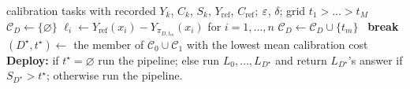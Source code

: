 \begin{algorithm}[!t]
\caption{\climb{} calibration and deployment}
\label{alg:climb}
\small
\begin{algorithmic}[1]
\Require calibration tasks with recorded $Y_k$, $C_k$, $S_k$, $Y_{\mathrm{ref}}$, $C_{\mathrm{ref}}$; $\varepsilon$, $\delta$; grid $t_1 > \dots > t_M$
 
  \State $\mathcal{C}_D \gets \{\varnothing\}$
    \State $\ell_i \gets Y_{\mathrm{ref}}(x_i) - Y_{\pi_{D, t_m}}(x_i)$ for $i = 1, \dots, n$
     $\mathcal{C}_D \gets \mathcal{C}_D \cup \{t_m\}$
    \Else\ \textbf{break}
    \EndIf
  \EndFor
\EndFor
\State $(D^\star, t^\star) \gets$ the member of $\mathcal{C}_0 \cup \mathcal{C}_1$ with the lowest mean calibration cost
\State \textbf{Deploy:} if $t^\star = \varnothing$ run the pipeline; else run $L_0, \dots, L_{D^\star}$ and
return $L_{D^\star}$'s answer if $S_{D^\star} > t^\star$; otherwise run the pipeline.
\end{algorithmic}
\end{algorithm}

